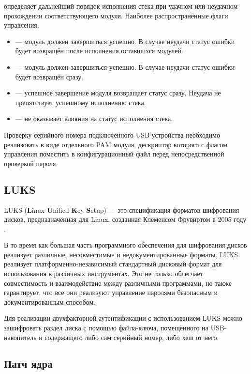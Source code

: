  определяет дальнейший порядок исполнения стека при удачном или неудачном прохождении соответствующего модуля.
Наиболее распространённые флаги управления:
\begin{itemize}
	\item {} — модуль должен завершиться успешно.
	В случае неудачи статус ошибки будет возвращён после исполнения оставшихся модулей.
	\item {} — модуль должен завершиться успешно.
	В случае неудачи статус ошибки будет возвращён сразу.
	\item {} — успешное завершение модуля возвращает статус  сразу.
	Неудача не препятствует успешному исполнению стека.
	\item {} — не оказывает влияния на статус исполнения стека.
\end{itemize}

Проверку серийного номера подключённого USB-устройства необходимо реализовать в виде отдельного PAM модуля, дескриптор которого с флагом управления  поместить в конфигурационный файл  перед непосредственной проверкой пароля.

\subsection{LUKS}

LUKS (\textbf{L}inux \textbf{U}nified \textbf{K}ey \textbf{S}etup) — это спецификация форматов шифрования дисков, предназначенная для Linux, созданная Клеменсом Фрувиртом в 2005 году \cite{fruhwirth}.

В то время как большая часть программного обеспечения для шифрования дисков реализует различные, несовместимые и недокументированные форматы, LUKS реализует платформенно-независимый стандартный дисковый формат для использования в различных инструментах.
Это не только облегчает совместимость и взаимодействие между различными программами, но также гарантирует, что все они реализуют управление паролями безопасным и документированным способом.

Для реализации двухфакторной аутентификации с использованием LUKS можно зашифровать раздел диска с помощью файла-ключа, помещённого на USB-накопитель и содержащего либо сам серийный номер, либо хеш от него.

\subsection{Патч ядра}

